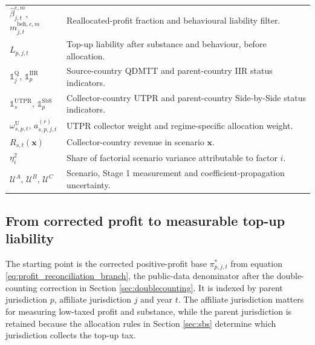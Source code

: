 \documentclass[11pt,a4paper]{article}
\begin{document}
\begin{table}[H]
\begin{tabular}{@{}L{3.15cm}>{\raggedright\arraybackslash}p{10.8cm}@{}}
$\hat{\beta}_{j,t}^{e,m}$, $m_{j,t}^{\text{beh},e,m}$ & Reallocated-profit fraction and behavioural liability filter. \\
$L_{p,j,t}$ & Top-up liability after substance and behaviour, before allocation. \\
$\mathbb{1}_j^{\text{Q}}$, $\mathbb{1}_p^{\text{IIR}}$ & Source-country QDMTT and parent-country IIR status indicators. \\
$\mathbb{1}_s^{\text{UTPR}}$, $\mathbb{1}_p^{\text{SbS}}$ & Collector-country UTPR and parent-country Side-by-Side status indicators. \\
$\omega_{s,p,t}^{\text{U}}$, $a_{s,p,j,t}^{(r)}$ & UTPR collector weight and regime-specific allocation weight. \\
$R_{s,t}(\mathbf{x})$ & Collector-country revenue in scenario $\mathbf{x}$. \\
$\eta_i^2$ & Share of factorial scenario variance attributable to factor $i$. \\
$\mathcal{U}^{A}$, $\mathcal{U}^{B}$, $\mathcal{U}^{C}$ & Scenario, Stage 1 measurement and coefficient-propagation uncertainty. \\
\bottomrule
\end{tabular}
\end{table}

\subsection{From corrected profit to measurable top-up liability}

The starting point is the corrected positive-profit base $\pi^{*}_{p,j,t}$ from equation \eqref{eq:profit_reconciliation_branch}, the public-data denominator after the double-counting correction in Section \ref{sec:doublecounting}. It is indexed by parent jurisdiction $p$, affiliate jurisdiction $j$ and year $t$. The affiliate jurisdiction matters for measuring low-taxed profit and substance, while the parent jurisdiction is retained because the allocation rules in Section \ref{sec:sbs} determine which jurisdiction collects the top-up tax.
\end{document}
